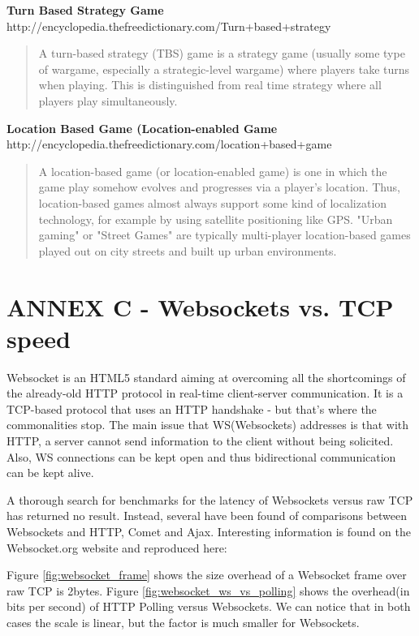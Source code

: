 \documentclass{article}
\begin{document}
\textbf{Turn Based Strategy Game}
	http://encyclopedia.thefreedictionary.com/Turn+based+strategy
\begin{quote}
A turn-based strategy (TBS) game is a strategy game (usually some type of
wargame, especially a strategic-level wargame) where players take turns when
playing. This is distinguished from real time strategy where all players play
simultaneously.
\end{quote}

\textbf{Location Based Game (Location-enabled Game}
	http://encyclopedia.thefreedictionary.com/location+based+game
\begin{quote}
A location-based game (or location-enabled game) is one in which the game play
somehow evolves and progresses via a player's location. Thus, location-based
games almost always support some kind of localization technology, for example by
using satellite positioning like GPS. "Urban gaming" or "Street Games" are
typically multi-player location-based games played out on city streets and built
up urban environments.
\end{quote}


\section{ANNEX C - Websockets vs. TCP speed}

Websocket is an HTML5 standard aiming at overcoming all the shortcomings of the
already-old HTTP protocol in real-time client-server communication. It is a
TCP-based protocol that uses an HTTP handshake - but that's where the
commonalities stop. The main issue that WS(Websockets) addresses is that with
HTTP, a server cannot send information to the client without being solicited.
Also, WS connections can be kept open and thus bidirectional communication can
be kept alive.\newline

A thorough search for benchmarks for the latency of Websockets versus raw TCP
has returned no result. Instead, several have been found of comparisons between
Websockets and HTTP, Comet and Ajax. Interesting information is found on the
Websocket.org website and reproduced here: \newline

Figure \ref{fig:websocket_frame} shows the size overhead of a Websocket frame
over raw TCP is 2bytes. Figure \ref{fig:websocket_ws_vs_polling} shows the
overhead(in bits per second) of HTTP Polling versus Websockets. We can notice
that in both cases the scale is linear, but the factor is much smaller for
Websockets.\newline
\end{document}
